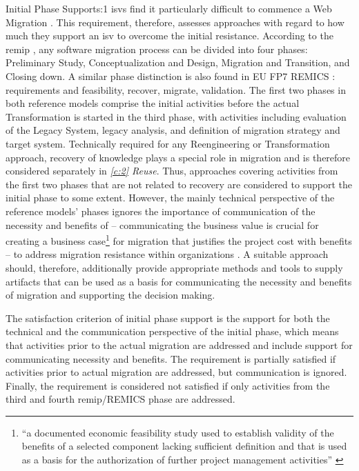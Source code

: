 \begin{thesisscoperequirement}{Initial Phase Support}{s:1}
\glspl{isv} find it particularly difficult to commence a \gls{Web Migration} \autocite{Heil2017Survey,Heil2018ReWaMP}.
This requirement, therefore, assesses approaches with regard to how much they support an \gls{isv} to overcome the initial resistance.
According to the \gls{remip} \autocite{Sneed2010ReMiP}, any software migration process can be divided into four phases: Preliminary Study, Conceptualization and Design, Migration and Transition, and Closing down.
A similar phase distinction is also found in EU FP7 REMICS \autocite{Krasteva2013REMICSAgile}: requirements and feasibility, recover, migrate, validation.
The first two phases in both reference models comprise the initial activities before the actual \gls{Transformation} is started in the third phase, with activities including evaluation of the \gls{Legacy System}, legacy analysis, and definition of migration strategy and \gls{target system}.
Technically required for any \gls{Reengineering} or \gls{Transformation} approach, recovery of knowledge plays a special role in migration and is therefore considered separately in \emph{\cref{c:2} Reuse}.
Thus, approaches covering activities from the first two phases that are not related to recovery are considered to support the initial phase to some extent.
However, the mainly technical perspective of the reference models' phases ignores the importance of communication of the necessity and benefits of  -- communicating the business value is crucial for creating a \gls{business case}\footnote{``a documented economic feasibility study used to establish validity of the benefits of a selected component lacking sufficient definition and that is used as a basis for the authorization of further project management activities'' \autocite{ISO/IEEE24765Vocabulary}} for migration \autocite{AmazonWebServices2018Migration,Khadka2016PHD,Menychtas2014ARTISTJournal,Batlajery2014IndustrialSurveyModernization,Khadka2014ProfessionalsModernization} that justifies the project cost with benefits \autocite{Sneed1995CostBenefit} -- to address migration resistance within organizations \autocite{Khadka2014ProfessionalsModernization,Sneed2010ReMiP}.
A suitable approach should, therefore, additionally provide appropriate methods and tools to supply \glspl{artifact} that can be used as a basis for communicating the necessity and benefits of migration and supporting the decision making.

The satisfaction criterion of initial phase support is the support for both the technical and the communication perspective of the initial phase, which means that activities prior to the actual migration are addressed and include support for communicating necessity and benefits.
The requirement is partially satisfied if activities prior to actual migration are addressed, but communication is ignored.
Finally, the requirement is considered not satisfied if only activities from the third and fourth \gls{remip}/REMICS phase are addressed.
\end{thesisscoperequirement}

